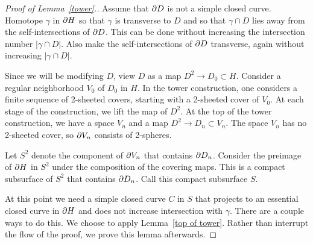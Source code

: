 \begin{proof}[Proof of Lemma~\ref{tower}.]
Assume that $\partial D$ is not a simple closed curve.  Homotope $\gamma$ in $\partial H$ so that $\gamma$ is transverse to $D$ and so that $\gamma\cap D$ lies away from the self-intersections of $\partial D$.  This can be done without increasing the intersection number $|\gamma\cap D|$.  Also make the self-intersections of $\partial D$ transverse, again without increasing $|\gamma\cap D|$.

Since we will be modifying $D$, view $D$ as a map $D^{2}\rightarrow D_{0}\subset H$.  Consider a regular neighborhood $V_{0}$ of $D_{0}$ in $H$.  In the tower construction, one considers a finite sequence of 2-sheeted covers, starting with a 2-sheeted cover of $V_{0}$.  At each stage of the construction, we lift the map of $D^{2}$.  At the top of the tower construction, we have a space $V_{n}$ and a map $D^{2}\rightarrow D_{n}\subset V_{n}$.  The space $V_{n}$ has no 2-sheeted cover, so $\partial V_{n}$ consists of 2-spheres.

Let $S^{2}$ denote the component of $\partial V_{n}$ that contains $\partial D_{n}$.  Consider the preimage of $\partial H$ in $S^{2}$ under the composition of the covering maps.  This is a compact subsurface of $S^{2}$ that contains $\partial D_{n}$.  Call this compact subsurface $S$.

At this point we need a simple closed curve $C$ in $S$ that projects to an essential closed curve in $\partial H$ and does not increase intersection with $\gamma$.  There are a couple ways to do this.  We choose to apply Lemma~\ref{top of tower}.  Rather than interrupt the flow of the proof, we prove this lemma afterwards.




\end{proof}
